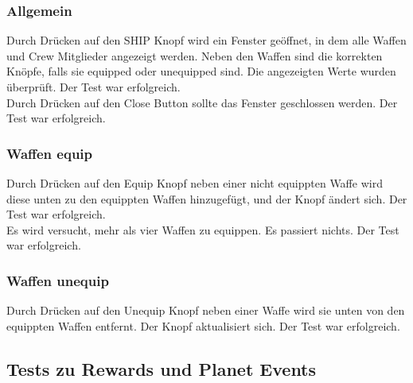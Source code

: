 \documentclass[fontsize=12pt,paper=a4,twoside]{scrartcl}
\begin{document}
\subsubsection{Allgemein}
Durch Drücken auf den SHIP Knopf wird ein Fenster geöffnet, in dem alle Waffen und Crew Mitglieder angezeigt werden. Neben den Waffen sind die korrekten Knöpfe, falls sie equipped oder unequipped sind. Die angezeigten Werte wurden überprüft. Der Test war erfolgreich. \\
Durch Drücken auf den Close Button sollte das Fenster geschlossen werden.  Der Test war erfolgreich. \\
\subsubsection{Waffen equip}
Durch Drücken auf den Equip Knopf neben einer nicht equippten Waffe wird diese unten zu den equippten Waffen hinzugefügt, und der Knopf ändert sich. Der Test war erfolgreich. \\
Es wird versucht, mehr als vier Waffen zu equippen. Es passiert nichts. Der Test war erfolgreich. \\
\subsubsection{Waffen unequip}
Durch Drücken auf den Unequip Knopf neben einer Waffe wird sie unten von den equippten Waffen entfernt. Der Knopf aktualisiert sich. Der Test war erfolgreich. \\



\subsection{Tests zu Rewards und Planet Events}
\end{document}
